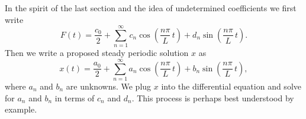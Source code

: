 \documentclass[12pt]{book}
\begin{document}
In the spirit of the last section and the idea of undetermined coefficients
we first write
\begin{equation*}
F(t) = \frac{c_0}{2} + \sum_{n=1}^\infty
c_n \cos \left( \frac{n \pi}{L}\, t \right) +
d_n \sin \left( \frac{n \pi}{L}\, t \right) .
\end{equation*}
Then we write a proposed steady periodic solution $x$ as
\begin{equation*}
x(t) = \frac{a_0}{2} + \sum_{n=1}^\infty
a_n \cos \left( \frac{n \pi}{L}\, t \right) +
b_n \sin \left( \frac{n \pi}{L}\, t \right) ,
\end{equation*}
where $a_n$ and $b_n$ are unknowns.
We plug $x$ into the differential equation and solve for $a_n$ and
$b_n$ in terms of $c_n$ and $d_n$.  This process
is perhaps best understood by example.
\pagebreak[2]
\end{document}
